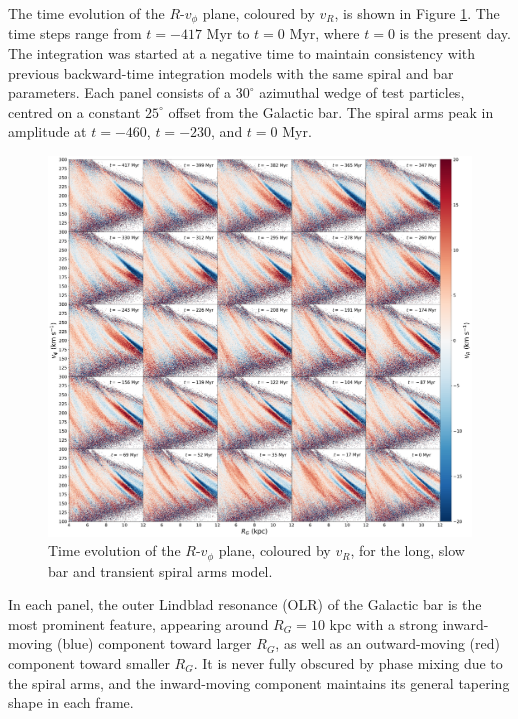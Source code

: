 \documentclass[10pt]{article}
\begin{document}
The time evolution of the $R$-$v_\phi$ plane, coloured by $v_R$, is shown in Figure \ref{fig:lsb}. The time steps range from $t = -417$ Myr to $t = 0$ Myr, where $t = 0$ is the present day. The integration was started at a negative time to maintain consistency with previous backward-time integration models with the same spiral and bar parameters. Each panel consists of a $30^\circ$ azimuthal wedge of test particles, centred on a constant $25^\circ$ offset from the Galactic bar. The spiral arms peak in amplitude at $t = -460$, $t = -230$, and $t = 0$ Myr.

\begin{figure}[h]
    \centering
    \includegraphics[width=\textwidth]{plots/base_spiral_RvT_vR.pdf}
    \caption{Time evolution of the $R$-$v_\phi$ plane, coloured by $v_R$, for the long, slow bar and transient spiral arms model.}
    \label{fig:lsb}
\end{figure}

In each panel, the outer Lindblad resonance (OLR) of the Galactic bar is the most prominent feature, appearing around $R_G = 10$ kpc with a strong inward-moving (blue) component toward larger $R_G$, as well as an outward-moving (red) component toward smaller $R_G$. It is never fully obscured by phase mixing due to the spiral arms, and the inward-moving component maintains its general tapering shape in each frame.
\end{document}
